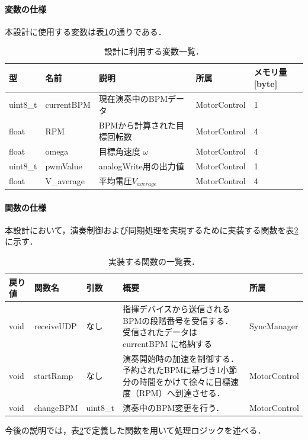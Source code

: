 \documentclass[uplatex,dvipdfmx]{jlreq}
\begin{document}
\paragraph{変数の仕様}
本設計に使用する変数は表\ref{tab:hensuu1}の通りである．

\begin{table}[H]
\centering
\caption{設計に利用する変数一覧．}
\label{tab:hensuu1}
\begin{tabular}{lllll}
\hline
型 & 名前 & 説明 & 所属 & メモリ量 [byte] \\
\hline
uint8\_t & currentBPM & 現在演奏中のBPMデータ & MotorControl & 1 \\
float & RPM & BPMから計算された目標回転数 & MotorControl & 4 \\
float & omega & 目標角速度 $\omega$ & MotorControl & 4 \\
uint8\_t & pwmValue & analogWrite用の出力値 & MotorControl & 1 \\
float & V\_average & 平均電圧$V_{average}$ & MotorControl & 4 \\
\hline
\end{tabular}
\end{table}

\paragraph{関数の仕様}
本設計において，演奏制御および同期処理を実現するために実装する関数を表\ref{tab:function}に示す．

\begin{table}[H]
\centering
\caption{実装する関数の一覧表．}
\label{tab:function}
\begin{tabular}{lllp{6cm}l}
\hline
戻り値 & 関数名 & 引数 & 概要 & 所属 \\ \hline
void & receiveUDP & なし & 指揮デバイスから送信されるBPMの段階番号を受信する．受信されたデータは currentBPM に格納する & SyncManager \\ \hline
void & startRamp & なし & 演奏開始時の加速を制御する．予約されたBPMに基づき1小節分の時間をかけて徐々に目標速度（RPM）へ到達させる． & MotorControl \\ \hline
void & changeBPM & uint8\_t & 演奏中のBPM変更を行う． & MotorControl \\ \hline
\end{tabular}
\end{table}

今後の説明では，表\ref{tab:function}で定義した関数を用いて処理ロジックを述べる．
\end{document}
